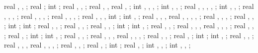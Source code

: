 {{real \shearwallstartx, \shearwallstarty \shearwalldeltax, \shearwalldeltay;
real \shearwalllinet;
int \showmarksuper;
real \marksuperexspace, \marksuperrad, \marksuperlinet;
real \marksuperleftstartx, \marksuperleftstarty,
real \marksuperdeltax, \marksuperdeltay;
int \leftstory, \leftlevel, \rightstory, \rightlevel;
int \leftopenstory, \rightopenstory, \showopenstory;
real \leftwallh, \leftopenh, \rightwallh, \rightopenh, \diffwallh;
int \showphorizontalsprings, \phorspringnumber, \phorspringdir;
real \phorspbtwspr, \phorspringspace, \phorspringstartratio, \phorspringendratio;
real \phortextshiftx, \phortextshifty, \phorprelenratio, \phorpostlenratio;
real \phorsegm, \phorsprwid, \phorsprscale, \phorsprlinethk;
real \phorsuppwidth, \phorsuppdepth, \phorsupplinethk,
int \phorshowsuppshade;
int \showpverticalsprings, \pverspringnumber;
real \pverspringspace, \pverspringstartratio, \pverspringendratio,
real \pvertextshiftx, \pvertextshifty, \pverspringlength, \pverprelenratio, \pverpostlenratio;
real \pverampl, \pversegm, \pverspringscale, \pverspringthk;
real \pversuppwidth, \pversuppdepth, \pversupplinethk;
int \pvershowsuppshade;
int \showpaxialspring;
real \paxialspringlength, \paxialspringprelenratio, \paxialspringpostlenratio;
real \paxialspringsegm, \paxialspringwidth, \paxialspringlinethk;
real \paxialsuppwidth, \paxialsuppdepth, \paxialsupplinethk;
int \paxialshowsuppshade;
int \leftwshowsprings, \leftwspringnumber;
real \leftwspringspace, \leftwspringstartratio, \leftwspringendratio;
real \leftwtextshiftx, \leftwtextshifty, \leftwspringlength,
real \leftwprelenratio, \leftwpostlenratio, \leftwampl, \leftwsegm;
real \leftwspringscale, \leftwspringthk, \leftwsuppwidth;
real \leftwsuppdepth, \leftwsupplinethk;
int \leftwshowsuppshade;
int \rightwshowsprings, \rightwspringnumber;
real \rightwspringspace, \rightwspringstartratio, \rightwspringendratio;
real \rightwtextshiftx, \rightwtextshifty, \rightwspringlength,
real \rightwprelenratio, \rightwpostlenratio, \rightwampl, \rightwsegm;
real \rightwspringscale, \rightwspringthk, \rightwsuppwidth;
real \rightwsuppdepth, \rightwsupplinethk;
int \rightwshowsuppshade;
int \foundshowsprings, \foundspringnumber;
real \foundspringspace, \foundspringstartratio, \foundspringendratio;
real \foundtextshiftx, \foundtextshifty, \foundspringlength,
real \foundprelenratio, \foundpostlenratio, \foundampl, \foundsegm;
real \foundspringscale, \foundspringthk, \foundsuppwidth;
real \foundsuppdepth, \foundsupplinethk;
int \foundshowsuppshade;
real \pinnedy, \aaa;
int \showleftpinsup, \showrightpinsup, \showbottompinsup;
int \nbotpin, \ibot, \ijkk;
}}
